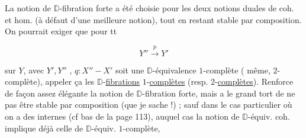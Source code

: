 



La notion de $\mathbb D$-fibration forte a été  choisie pour  les deux notions duales de  coh. et hom. (à défaut d'une meilleure notion), tout en restant stable par composition. On pourrait exiger que pour tt

\[Y''\xrightarrow{p}Y'\]

sur $Y$, avec $Y',Y''$ , $q:X''-X'$ soit une $\mathbb D$-équivalence $1$-complète ( même,  $2$-complète), appeler ça les $\mathbb D$-\uline{fibrations} $1$-\uline{complètes} (resp. $2$-\uline{complètes}).  Renforce  de façon assez élégante la notion de $\mathbb D$-fibration forte, mais a le grand tort de ne pas être stable par composition (que je sache !) ; sauf dans le cas particulier où on a des  internes  (cf bas de la page 113), auquel cas la notion de $\mathbb D$-équiv. coh. implique déjà celle de $\mathbb D$-équiv. $1$-complète,
